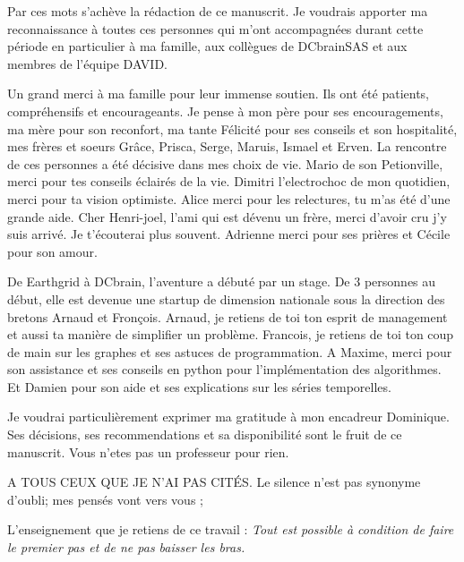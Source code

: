 

Par ces mots s'ach\`eve la r\'edaction de ce manuscrit.
Je voudrais apporter ma reconnaissance \`a toutes ces personnes qui m'ont accompagn\'ees durant cette p\'eriode en particulier \`a ma famille, aux coll\`egues de DCbrainSAS et aux membres de l'\'equipe DAVID.
\newline 

Un grand merci \`a ma famille pour leur immense soutien. Ils ont \'et\'e patients, compr\'ehensifs et encourageants. Je pense \`a mon p\`ere pour ses encouragements, ma m\`ere pour son reconfort, ma tante F\'elicit\'e pour ses conseils et son hospitalit\'e, mes fr\`eres et soeurs Gr\^ace, Prisca, Serge, Maruis, Ismael et Erven. 
\newline
La rencontre de ces personnes a \'et\'e d\'ecisive dans mes choix de vie. 
Mario de son Petionville, merci pour tes conseils \'eclair\'es de la vie.
Dimitri l'electrochoc de mon quotidien, merci pour ta vision optimiste. 
Alice merci pour les relectures, tu m'as \'et\'e d'une grande aide.
Cher Henri-joel, l'ami qui est d\'evenu un fr\`ere, merci d'avoir cru j'y suis arriv\'e. Je t'\'ecouterai plus souvent.   
Adrienne merci pour ses pri\`eres et C\'ecile pour son amour.
\newline

De Earthgrid \`a DCbrain, l'aventure a d\'ebut\'e par un stage. De $3$ personnes au d\'ebut, elle est devenue une startup de dimension nationale sous la direction des bretons Arnaud et Fron\c cois. 
Arnaud, je retiens de toi ton esprit de management et aussi ta mani\`ere de simplifier un probl\`eme.
Francois, je retiens  de toi ton  coup de main sur les graphes et ses astuces de programmation.
A Maxime, merci pour son assistance et ses conseils en python pour l'impl\'ementation des algorithmes.
Et Damien pour son aide et ses explications sur les s\'eries temporelles.
\newline

Je voudrai particuli\`erement exprimer ma gratitude \`a  mon encadreur Dominique. Ses d\'ecisions, ses recommendations et sa disponibilit\'e sont le fruit de ce manuscrit. 
Vous n'etes pas un professeur pour rien.
\newline

A TOUS CEUX QUE JE N'AI PAS CIT\'ES.
Le silence n'est pas synonyme d'oubli; mes pens\'es vont vers vous ;
\newline

L'enseignement que je retiens de ce travail : \newline
{\em Tout est possible \`a condition de faire le premier pas et de ne pas baisser les bras.}
